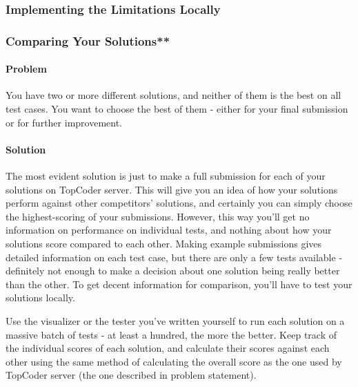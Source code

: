 \documentclass[]{article}
\let\oldparagraph\paragraph
\renewcommand{\paragraph}[1]{\oldparagraph{#1}\mbox{}}
\begin{document}
\hypertarget{implementing-the-limitations-locally}{%
\subsubsection{Implementing the Limitations
Locally}\label{implementing-the-limitations-locally}}

\hypertarget{comparing-your-solutions}{%
\subsubsection{Comparing Your
Solutions**}\label{comparing-your-solutions}}

\hypertarget{problem-3}{%
\paragraph{Problem}\label{problem-3}}

You have two or more different solutions, and neither of them is the
best on all test cases. You want to choose the best of them - either for
your final submission or for further improvement.

\hypertarget{solution-3}{%
\paragraph{Solution}\label{solution-3}}

The most evident solution is just to make a full submission for each of
your solutions on TopCoder server. This will give you an idea of how
your solutions perform against other competitors' solutions, and
certainly you can simply choose the highest-scoring of your submissions.
However, this way you'll get no information on performance on individual
tests, and nothing about how your solutions score compared to each
other. Making example submissions gives detailed information on each
test case, but there are only a few tests available - definitely not
enough to make a decision about one solution being really better than
the other. To get decent information for comparison, you'll have to test
your solutions locally.

Use the visualizer or the tester you've written yourself to run each
solution on a massive batch of tests - at least a hundred, the more the
better. Keep track of the individual scores of each solution, and
calculate their scores against each other using the same method of
calculating the overall score as the one used by TopCoder server (the
one described in problem statement).
\end{document}
